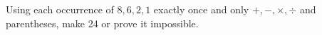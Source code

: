 Using each occurrence of $8,6,2,1$ exactly once and only $+,-,\times,\div$ and parentheses, make 24 or prove it impossible.
